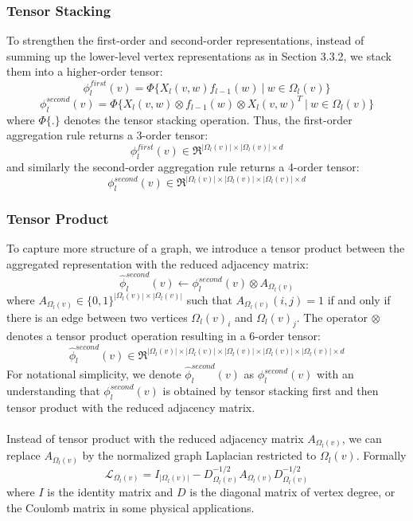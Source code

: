 \documentclass[a4paper]{article}
\begin{document}
\subsubsection{Tensor Stacking}

To strengthen the first-order and second-order representations, instead of summing up the lower-level vertex representations as in Section 3.3.2, we stack them into a higher-order tensor:
$$\phi_l^{first}(v) = \Phi \big\{ X_l(v, w) f_{l - 1}(w) \ \big| \ w \in \Omega_l(v) \big\}$$
$$\phi_l^{second}(v) = \Phi \big\{ X_l(v, w) \otimes f_{l - 1}(w) \otimes X_l(v, w)^T \ \big| \ w \in \Omega_l(v) \big\}$$
where $\Phi\{.\}$ denotes the tensor stacking operation. Thus, the first-order aggregation rule returns a 3-order tensor:
$$\phi_l^{first}(v) \in \Re^{|\Omega_l(v)| \times |\Omega_l(v)| \times d}$$
and similarly the second-order aggregation rule returns a 4-order tensor:
$$\phi_l^{second}(v) \in \Re^{|\Omega_l(v)| \times |\Omega_l(v)| \times |\Omega_l(v)| \times d}$$

\subsubsection{Tensor Product}

To capture more structure of a graph, we introduce a tensor product between the aggregated representation with the reduced adjacency matrix:
$$\hat{\phi}_l^{second}(v) \leftarrow \phi_l^{second}(v) \otimes A_{\Omega_l(v)}$$
where $A_{\Omega_l(v)} \in \{0, 1\}^{|\Omega_l(v)| \times |\Omega_l(v)|}$ such that $A_{\Omega_l(v)}(i, j) = 1$ if and only if there is an edge between two vertices $\Omega_l(v)_i$ and $\Omega_l(v)_j$. The operator $\otimes$ denotes a tensor product operation resulting in a 6-order tensor:
$$\hat{\phi}_l^{second}(v) \in \Re^{|\Omega_l(v)| \times |\Omega_l(v)| \times|\Omega_l(v)| \times |\Omega_l(v)| \times |\Omega_l(v)| \times d}$$
For notational simplicity, we denote $\hat{\phi}_l^{second}(v)$ as $\phi_l^{second}(v)$ with an understanding that $\phi_l^{second}(v)$ is obtained by tensor stacking first and then tensor product with the reduced adjacency matrix. \\ \\
Instead of tensor product with the reduced adjacency matrix $A_{\Omega_l(v)}$, we can replace $A_{\Omega_l(v)}$ by the normalized graph Laplacian restricted to $\Omega_l(v)$. Formally 
\[\mathcal{L}_{\Omega_l(v)} = I_{|\Omega_l(v)|} - D_{\Omega_l(v)}^{-1/2} A_{\Omega_l(v)} D_{\Omega_l(v)}^{-1/2}\]
 where $I$ is the identity matrix and $D$ is the diagonal matrix of vertex degree, or the Coulomb matrix in some physical applications.
\end{document}
